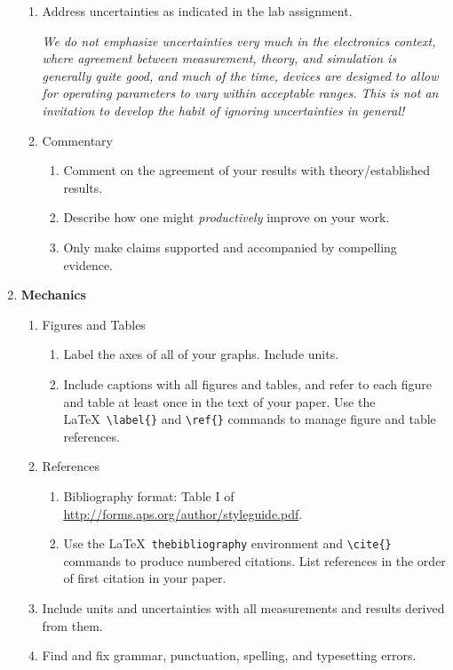 \documentclass[11 pt]{article}
\begin{document}
\begin{enumerate}
\begin{enumerate}
  \item Address uncertainties as indicated in the lab
    assignment.

    \emph{We do not emphasize uncertainties very much in the
      electronics context, where agreement between measurement,
      theory, and simulation is generally quite good, and much of the
      time, devices are designed to allow for operating parameters to
      vary within acceptable ranges. This is not an invitation to
      develop the habit of ignoring uncertainties in general!}

  \item Commentary
    \begin{enumerate}
    \item Comment on the agreement of your results with
      theory/established results.

    \item Describe how one might \textit{productively} improve on your work.

    \item Only make claims supported and accompanied by compelling evidence.

    \end{enumerate}

  \end{enumerate}

\item \textbf{Mechanics}
  \begin{enumerate}
  \item Figures and Tables
    \begin{enumerate}
    \item Label the axes of all of your graphs. Include units.

    \item Include captions with all figures and tables, and refer to
      each figure and table at least once in the text of your
      paper. Use the \LaTeX\ \verb+\label{}+ and \verb+\ref{}+
      commands to manage figure and table references.

    \end{enumerate}

  \item References 
    \begin{enumerate}
    \item Bibliography format: Table I of 
      \url{http://forms.aps.org/author/styleguide.pdf}.

    \item Use the \LaTeX\ \verb+thebibliography+ environment and
      \verb+\cite{}+ commands to produce numbered citations. List
      references in the order of first citation in your paper.
    \end{enumerate}

  \item Include units and uncertainties with all measurements and
    results derived from them.

  \item Find and fix grammar, punctuation, spelling, and typesetting
    errors.

  \end{enumerate}

\end{enumerate}
\end{document}
